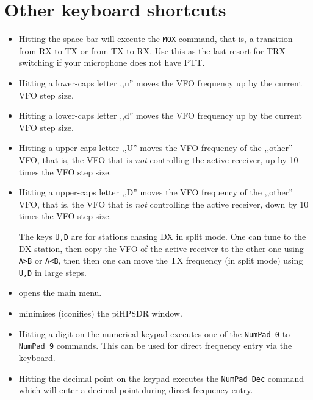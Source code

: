 \documentclass[12pt]{book}
\def\rett#1{\texttt{\color{red}#1}}
\def\bltt#1{\texttt{\color{blue}#1}}
\def\pH{pi\-HPSDR\xspace}
\begin{document}
\section{Other keyboard shortcuts}

\begin{itemize}

\item[\rett{space}]{ Hitting the space bar will execute the \bltt{MOX} command, that is, a
transition from RX to TX or from TX to RX. Use this as the last resort for TRX switching
if your microphone does not have PTT.}

\item[\rett{u}]{ Hitting a lower-caps letter ,,u'' moves the VFO frequency up by the current VFO
step size.}

\item[\rett{d}]{ Hitting a lower-caps letter ,,d'' moves the VFO frequency up by the current VFO
step size.}

\item[\rett{U}]{ Hitting a upper-caps letter ,,U'' moves the VFO frequency of the ,,other'' VFO, that is,
the VFO that is \textit{not} controlling the active receiver, up by 10 times the VFO step size.}

\item[\rett{D}]{ Hitting a upper-caps letter ,,D'' moves the VFO frequency of the ,,other'' VFO, that is,
the VFO that is \textit{not} controlling the active receiver, down by 10 times the VFO step size.

The keys \rett{U,D} are for stations chasing DX in split mode. One can tune to the DX station,
then copy the VFO of the active receiver to the other one using \bltt{A>B} or \bltt{A<B}, then then
one can  move the TX frequency (in split mode) using \rett{U,D} in large steps.}

\item[\rett{m}, \rett{M}]{ opens the main menu.}

\item[\rett{I}]{ minimises (iconifies) the \pH window.}

\item[\rett{KP 0-9}]{ Hitting a digit on the numerical keypad executes one of the
\bltt{NumPad 0} to \bltt{NumPad 9} commands. This can be used for direct frequency entry
via the keyboard.}

\item[\rett{KP .}]{Hitting the decimal point on the keypad executes the \bltt{NumPad Dec}
command which will enter a decimal point during direct frequency entry.}


\end{itemize}
\end{document}
